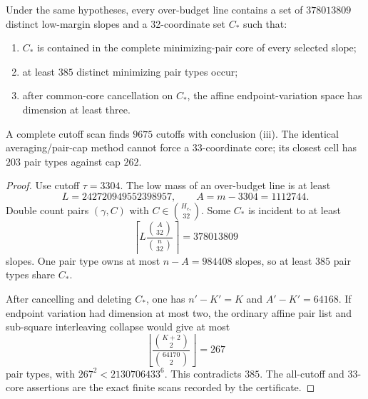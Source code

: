 \begin{theorem}
\label{thm:mca-rank11-critical-pair-core}
Under the same hypotheses, every over-budget line contains a set of
\(378013809\) distinct low-margin slopes and a 32-coordinate set \(C_*\)
such that:
\begin{enumerate}[label=\textup{(\roman*)}]
\item \(C_*\) is contained in the complete minimizing-pair core of every
selected slope;
\item at least \(385\) distinct minimizing pair types occur;
\item after common-core cancellation on \(C_*\), the affine endpoint-variation
space has dimension at least three.
\end{enumerate}
A complete cutoff scan finds \(9675\) cutoffs with conclusion
\textup{(iii)}.  The identical averaging/pair-cap method cannot force a
33-coordinate core; its closest cell has \(203\) pair types against cap
\(262\).
\end{theorem}

\begin{proof}
Use cutoff \(\tau=3304\).  The low mass of an over-budget line is at least
\[
 L=242720949552398957,
 \qquad A=m-3304=1112744.
\]
Double count pairs \((\gamma,C)\) with
\(C\in\binom{H_{e_\gamma}}{32}\).  Some \(C_*\) is incident to at least
\[
 \left\lceil L\frac{\binom A{32}}{\binom n{32}}\right\rceil
 =378013809
\]
slopes.  One pair type owns at most \(n-A=984408\) slopes, so at least
\(385\) pair types share \(C_*\).

After cancelling and deleting \(C_*\), one has
\(n'-K'=K\) and \(A'-K'=64168\).  If endpoint variation had dimension at
most two, the ordinary affine pair list and sub-square interleaving collapse
would give at most
\[
 \left\lfloor\frac{\binom{K+2}{2}}{\binom{64170}{2}}\right\rfloor
 =267
\]
pair types, with \(267^2<2130706433^6\).  This contradicts \(385\).
The all-cutoff and 33-core assertions are the exact finite scans recorded by
the certificate.
\end{proof}
